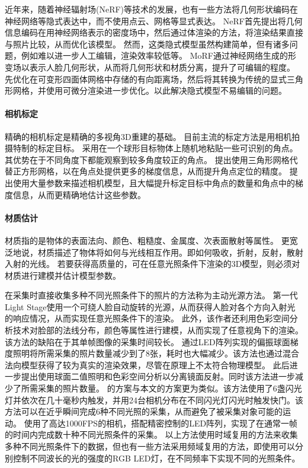 近年来，随着神经辐射场(NeRF)\citep{nerf}等技术的发展，也有一些方法将几何形状编码在神经网络等隐式表达中，而不使用点云、网格等显式表达。
NeRF\citep{nerf}首先提出将几何信息编码在用神经网络表示的密度场中，然后通过体渲染的方法，将渲染结果直接与照片比较，从而优化该模型。
然而，这类隐式模型虽然构建简单，但有诸多问题，例如难以进一步人工编辑，渲染效率较低等。
MoRF\citep{MoRF}通过神经网络生成的形变场以表示人脸几何形状，从而将几何形状和材质分离，提升了可编辑的程度。
\citet{nvdiffrec,nvdiffrecmc}先优化在可变形四面体网格中存储的有向距离场，然后将其转换为传统的显式三角形网格，并使用可微分渲染进一步优化。以此解决隐式模型不易编辑的问题。

\paragraph{相机标定}
精确的相机标定是精确的多视角3D重建的基础。
目前主流的标定方法是用相机拍摄特制的标定目标。
\citet{ss_geo}采用在一个球形目标物体上随机地粘贴一些可识别的角点。
其优势在于不同角度下都能观察到较多角度较正的角点。
\citet{del_grid}提出使用三角形网格代替正方形网格，以在角点处提供更多的梯度信息，从而提升角点定位的精度。
\citet{SchopsLPS20}提出使用大量参数来描述相机模型，且大幅提升标定目标中角点的数量和角点中的梯度信息，从而更精确地估计这些参数。

\paragraph{材质估计}
材质指的是物体的表面法向、颜色、粗糙度、金属度、次表面散射等属性。
更宽泛地说，材质描述了物体将如何与光线相互作用。即如何吸收，折射，反射，散射入射的光线。
若要获得高质量的，可在任意光照条件下渲染的3D模型，则必须对材质进行建模并估计模型参数。

在采集时直接收集多种不同光照条件下的照片的方法称为主动光源方法。
第一代Light Stage\citep{light_stage}使用一个可绕人脸自动旋转的光源，从而获得人脸对各个方向入射光的响应情况，从而实现任意光照条件下的渲染。
此外，该作者还利用色彩空间分析技术\cite{temporal_color}对脸部的法线分布，颜色等属性进行建模，从而实现了任意视角下的渲染。该方法的缺陷在于其单帧图像的采集时间较长。
\citet{MaHPCWD07}通过LED阵列实现的偏振球面梯度照明将所需采集的照片数量减少到了8张，耗时也大幅减少。该方法也通过混合法向模型获得了较为真实的渲染效果，尽管在原理上不太符合物理模型。
此后\citet{KampourisZG18}进一步提出使用球面二值照明和色彩空间分析\cite{MallickZKB05}以分离镜面反射。同时该方法进一步减少了所需采集的照片数量。
\citet{FyffeGTGD16}的方案与本文的方案更为类似。该方法使用了6盏闪光灯并依次在几十毫秒内触发，并用24台相机分布在不同闪光灯闪光时触发快门。该方法可以在近乎瞬间完成6种不同光照的采集，从而避免了被采集对象可能的运动。
\citet{ZhangZZLCYXY22}使用了高达1000FPS的相机，搭配精密控制的LED阵列，实现了在通常一帧的时间内完成数十种不同光照条件的采集。
以上方法使用时域复用的方法来收集多种不同光照条件下的数据，但也有一些方法\citep{FyffeD15,MekaHPZFFKYBDDB19}采用频域复用的方法，即使用可以分别控制不同波长的光的强度的RGB LED灯，在不同频率下实现不同的光照条件。


